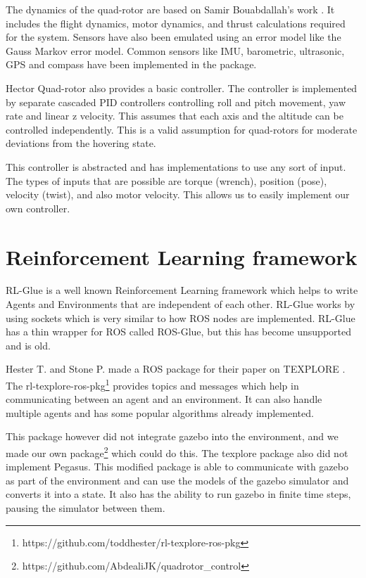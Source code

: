\documentclass[BTech]{iitmdiss}
\begin{document}
The dynamics of the quad-rotor are based on Samir Bouabdallah's work \cite{QuadrotorDynamics}. It includes the flight dynamics, motor dynamics, and thrust calculations required for the system. Sensors have also been emulated using an error model like the Gauss Markov error model. Common sensors like IMU, barometric, ultrasonic, GPS and compass have been implemented in the package.

Hector Quad-rotor also provides a basic controller. The controller is implemented by separate cascaded PID controllers controlling roll and pitch movement, yaw rate and linear z velocity. This assumes that each axis and the altitude can be controlled independently. This is a valid assumption for quad-rotors for moderate deviations from the hovering state.

This controller is abstracted and has implementations to use any sort of input. The types of inputs that are possible are torque (wrench), position (pose), velocity (twist), and also motor velocity. This allows us to easily implement our own controller.

\section{Reinforcement Learning framework}

RL-Glue \cite{RLGlue} is a well known Reinforcement Learning framework which helps to write Agents and Environments that are independent of each other. RL-Glue works by using sockets which is very similar to how ROS nodes are implemented. RL-Glue has a thin wrapper for ROS called ROS-Glue, but this has become unsupported and is old.

Hester T. and Stone P. made a ROS package for their paper on TEXPLORE \cite{Texplore}. The rl-texplore-ros-pkg\footnote{https://github.com/toddhester/rl-texplore-ros-pkg} provides topics and messages which help in communicating between an agent and an environment. It can also handle multiple agents and has some popular algorithms already implemented.

This package however did not integrate gazebo into the environment, and we made our own package\footnote{https://github.com/AbdealiJK/quadrotor\_control} which could do this. The texplore package also did not implement Pegasus. This modified package is able to communicate with gazebo as part of the environment and can use the models of the gazebo simulator and converts it into a state. It also has the ability to run gazebo in finite time steps, pausing the simulator between them.
\end{document}
